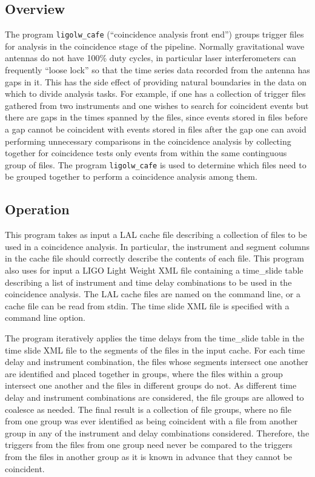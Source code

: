 \documentclass[10pt]{article}
\newcommand{\prog}[1]{\texttt{#1}}
\begin{document}
\subsection{Overview}


The program \prog{ligolw\_cafe} (``coincidence analysis front end'') groups
trigger files for analysis in the coincidence stage of the pipeline.
Normally gravitational wave antennas do not have 100\% duty cycles, in
particular laser interferometers can frequently ``loose lock'' so that the
time series data recorded from the antenna has gaps in it.  This has the
side effect of providing natural boundaries in the data on which to divide
analysis tasks.  For example, if one has a collection of trigger files
gathered from two instruments and one wishes to search for coincident
events but there are gaps in the times spanned by the files, since events
stored in files before a gap cannot be coincident with events stored in
files after the gap one can avoid performing unnecessary comparisons in the
coincidence analysis by collecting together for coincidence tests only
events from within the same continguous group of files.  The program
\prog{ligolw\_cafe} is used to determine which files need to be grouped
together to perform a coincidence analysis among them.


\subsection{Operation}


This program takes as input a LAL cache file describing a collection of
files to be used in a coincidence analysis.  In particular, the instrument
and segment columns in the cache file should correctly describe the
contents of each file.  This program also uses for input a LIGO Light
Weight XML file containing a time\_slide table describing a list of
instrument and time delay combinations to be used in the coincidence
analysis.  The LAL cache files are named on the command line, or a cache
file can be read from stdin.  The time slide XML file is specified with a
command line option.

The program iteratively applies the time delays from the time\_slide table
in the time slide XML file to the segments of the files in the input cache.
For each time delay and instrument combination, the files whose segments
intersect one another are identified and placed together in groups, where
the files within a group intersect one another and the files in different
groups do not.  As different time delay and instrument combinations are
considered, the file groups are allowed to coalesce as needed.  The final
result is a collection of file groups, where no file from one group was
ever identified as being coincident with a file from another group in any
of the instrument and delay combinations considered.  Therefore, the
triggers from the files from one group need never be compared to the
triggers from the files in another group as it is known in advance that
they cannot be coincident.
\end{document}
